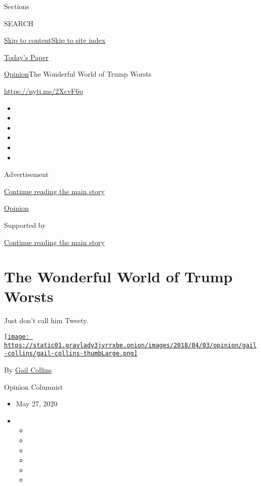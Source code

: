 Sections

SEARCH

\protect\hyperlink{site-content}{Skip to
content}\protect\hyperlink{site-index}{Skip to site index}

\href{https://myaccount.nytimes3xbfgragh.onion/auth/login?response_type=cookie\&client_id=vi}{}

\href{https://www.nytimes3xbfgragh.onion/section/todayspaper}{Today's
Paper}

\href{/section/opinion}{Opinion}\textbar{}The Wonderful World of Trump
Worsts

\url{https://nyti.ms/2XcvF6p}

\begin{itemize}
\item
\item
\item
\item
\item
\item
\end{itemize}

Advertisement

\protect\hyperlink{after-top}{Continue reading the main story}

\href{/section/opinion}{Opinion}

Supported by

\protect\hyperlink{after-sponsor}{Continue reading the main story}

\hypertarget{the-wonderful-world-of-trump-worsts}{%
\section{The Wonderful World of Trump
Worsts}\label{the-wonderful-world-of-trump-worsts}}

Just don't call him Tweety.

\href{https://www.nytimes3xbfgragh.onion/by/gail-collins}{\texttt{[image: https://static01.graylady3jvrrxbe.onion/images/2018/04/03/opinion/gail-collins/gail-collins-thumbLarge.png]}}

By \href{https://www.nytimes3xbfgragh.onion/by/gail-collins}{Gail
Collins}

Opinion Columnist

\begin{itemize}
\item
  May 27, 2020
\item
  \begin{itemize}
  \item
  \item
  \item
  \item
  \item
  \item
  \end{itemize}
\end{itemize}

